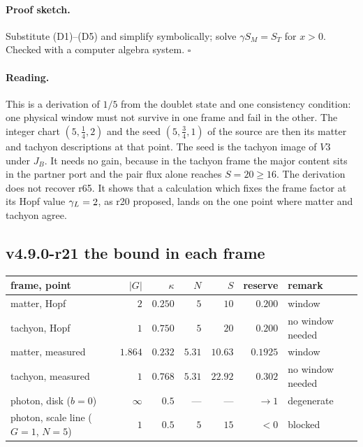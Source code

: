 \paragraph{Proof sketch.}
Substitute (D1)--(D5) and simplify symbolically; solve \(\gamma S_M=S_T\) for \(x>0\).  Checked with a computer algebra system.  \(\square\)

\paragraph{Reading.}
This is a derivation of \(1/5\) from the doublet state and one consistency condition: one physical window must not survive in
one frame and fail in the other.  The integer chart \((5,\tfrac14,2)\) and the seed \((5,\tfrac34,1)\) of the source are then its
matter and tachyon descriptions at that point.  The seed is the tachyon image of \(V3\) under \(J_B\).  It needs no gain, because
in the tachyon frame the major content sits in the partner port and the pair flux alone reaches \(S=20\ge16\).  The derivation
does not recover r65.  It shows that a calculation which fixes the frame factor at its Hopf value \(\gamma_L=2\), as r20 proposed,
lands on the one point where matter and tachyon agree.

\subsection*{v4.9.0-r21 the bound in each frame}
\label{subsec:v490-r21-per-frame}

\begin{center}
\small
\begin{tabular}{@{}>{\raggedright\arraybackslash}p{}rrrrrl@{}}
\toprule
frame, point & \(|G|\) & \(\kappa\) & \(N\) & \(S\) & reserve & remark\\
\midrule
matter, Hopf & \(2\) & \(0.250\) & \(5\) & \(10\) & \(0.200\) & window\\
tachyon, Hopf & \(1\) & \(0.750\) & \(5\) & \(20\) & \(0.200\) & no window needed\\
matter, measured & \(1.864\) & \(0.232\) & \(5.31\) & \(10.63\) & \(0.1925\) & window\\
tachyon, measured & \(1\) & \(0.768\) & \(5.31\) & \(22.92\) & \(0.302\) & no window needed\\
photon, disk (\(b=0\)) & \(\infty\) & \(0.5\) & --- & --- & \(\to1\) & degenerate\\
photon, scale line (\(G=1\), \(N=5\)) & \(1\) & \(0.5\) & \(5\) & \(15\) & \(<0\) & blocked\\
\bottomrule
\end{tabular}
\end{center}

